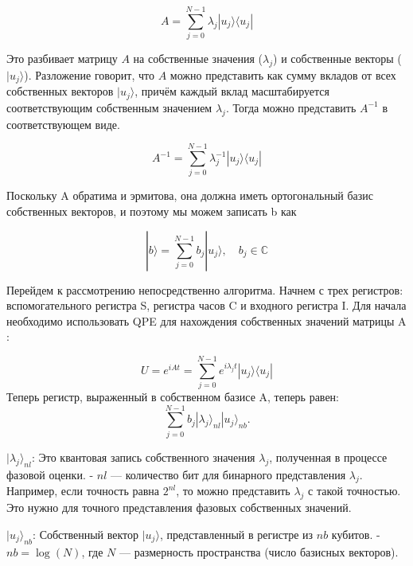 \[
A = \sum_{j=0}^{N-1} \lambda_j |u_j\rangle \langle u_j|
\]

Это разбивает матрицу \( A \) на  собственные значения (\( \lambda_j \)) и собственные векторы (\( |u_j\rangle \)).   Разложение говорит, что \( A \) можно представить как сумму вкладов от всех собственных векторов \( |u_j\rangle \), причём каждый вклад масштабируется соответствующим собственным значением \( \lambda_j \). 
Тогда можно представить \(A^{-1}\) в соответствующем виде.

\[
A^{-1} = \sum_{j=0}^{N-1} \lambda_j^{-1} |u_j\rangle \langle u_j|
\]

Поскольку A обратима и эрмитова, она должна иметь ортогональный базис собственных векторов, и поэтому мы можем записать b как

\[
|b\rangle = \sum_{j=0}^{N-1} b_j |u_j\rangle, \quad b_j \in \mathbb{C}
\]

Перейдем к рассмотрению непосредственно алгоритма. Начнем с трех регистров: вспомогательного регистра S, регистра часов C и входного регистра I. Для начала необходимо использовать QPE для нахождения собственных значений матрицы A :

   \[
   U = e^{iAt} = \sum_{j=0}^{N-1} e^{i\lambda_j t} |u_j\rangle \langle u_j|
   \]
Теперь регистр, выраженный в собственном базисе A, теперь равен: 
   \[
   \sum_{j=0}^{N-1} b_j |\lambda_j\rangle_{nl} |u_j\rangle_{nb}.
   \]

\( |\lambda_j\rangle_{nl} \):  
   Это квантовая запись собственного значения \( \lambda_j \), полученная в процессе фазовой оценки.  
   - \( nl \) — количество бит для бинарного представления \( \lambda_j \).  
     Например, если точность равна \( 2^{nl} \), то можно представить \( \lambda_j \) с такой точностью. Это нужно для точного представления фазовых собственных значений. 

\( |u_j\rangle_{nb} \):  
   Собственный вектор \( |u_j\rangle \), представленный в регистре из \( nb \) кубитов.  
   - \( nb = \log(N) \), где \( N \) — размерность пространства (число базисных векторов).
   \\

